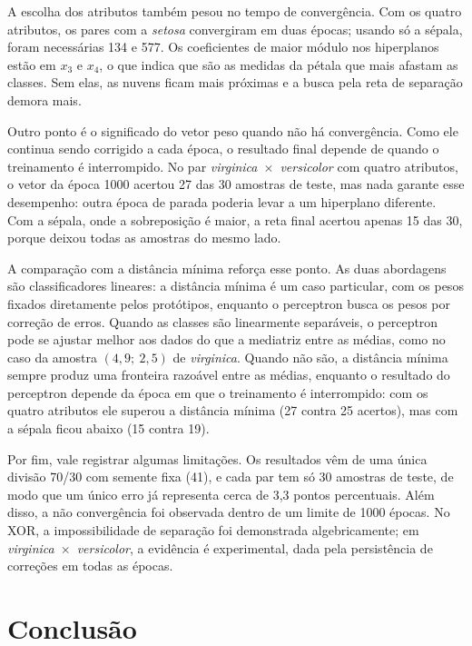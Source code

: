\documentclass[12pt,a4paper]{article}
\begin{document}
A escolha dos atributos também pesou no tempo de convergência. Com os quatro atributos, os pares com a \emph{setosa} convergiram em duas épocas; usando só a sépala, foram necessárias 134 e 577. Os coeficientes de maior módulo nos hiperplanos estão em $x_3$ e $x_4$, o que indica que são as medidas da pétala que mais afastam as classes. Sem elas, as nuvens ficam mais próximas e a busca pela reta de separação demora mais.

Outro ponto é o significado do vetor peso quando não há convergência. Como ele continua sendo corrigido a cada época, o resultado final depende de quando o treinamento é interrompido. No par \emph{virginica}~$\times$~\emph{versicolor} com quatro atributos, o vetor da época 1000 acertou 27 das 30 amostras de teste, mas nada garante esse desempenho: outra época de parada poderia levar a um hiperplano diferente. Com a sépala, onde a sobreposição é maior, a reta final acertou apenas 15 das 30, porque deixou todas as amostras do mesmo lado.

A comparação com a distância mínima reforça esse ponto. As duas abordagens são classificadores lineares: a distância mínima é um caso particular, com os pesos fixados diretamente pelos protótipos, enquanto o perceptron busca os pesos por correção de erros. Quando as classes são linearmente separáveis, o perceptron pode se ajustar melhor aos dados do que a mediatriz entre as médias, como no caso da amostra $(4{,}9;\ 2{,}5)$ de \emph{virginica}. Quando não são, a distância mínima sempre produz uma fronteira razoável entre as médias, enquanto o resultado do perceptron depende da época em que o treinamento é interrompido: com os quatro atributos ele superou a distância mínima (27 contra 25 acertos), mas com a sépala ficou abaixo (15 contra 19).

Por fim, vale registrar algumas limitações. Os resultados vêm de uma única divisão 70/30 com semente fixa (41), e cada par tem só 30 amostras de teste, de modo que um único erro já representa cerca de 3,3 pontos percentuais. Além disso, a não convergência foi observada dentro de um limite de 1000 épocas. No XOR, a impossibilidade de separação foi demonstrada algebricamente; em \emph{virginica}~$\times$~\emph{versicolor}, a evidência é experimental, dada pela persistência de correções em todas as épocas.

\section{Conclusão}
\end{document}
